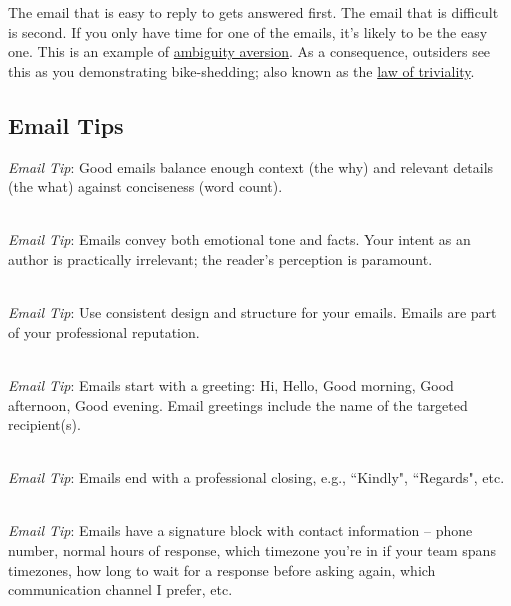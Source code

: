The email that is easy to reply to gets answered first.  The email that is difficult is second.
If you only have time for one of the emails, it's likely to be the easy one. This is an example of 
\href{https://en.wikipedia.org/wiki/Ambiguity_aversion}{ambiguity aversion}.
As a consequence, outsiders see this as you demonstrating bike-shedding; also known as the
\href{https://en.wikipedia.org/wiki/Law_of_triviality}{law of triviality}.



\subsection*{Email Tips\label{sec:email-structure}}

\textit{Email Tip}: Good emails balance enough context (the why) and relevant details (the what) against conciseness (word count). 

\ \\
\textit{Email Tip}: Emails convey both emotional tone and facts. Your intent as an author is practically irrelevant; the reader's perception is paramount. 



\ \\
\textit{Email Tip}: Use consistent design and structure for your emails. Emails are part of your professional reputation.

\ \\
\textit{Email Tip}: Emails start with a greeting: Hi, Hello, Good morning, Good afternoon, Good evening. 
Email greetings include the name of the targeted recipient(s). 

\ \\
\textit{Email Tip}: Emails end with a professional closing, e.g., ``Kindly", ``Regards", etc.

\ \\
\textit{Email Tip}: Emails have a signature block with contact information -- phone number, normal hours of response, which timezone you're in if your team spans timezones, how long to wait for a response before asking again, which communication channel I prefer, etc.

